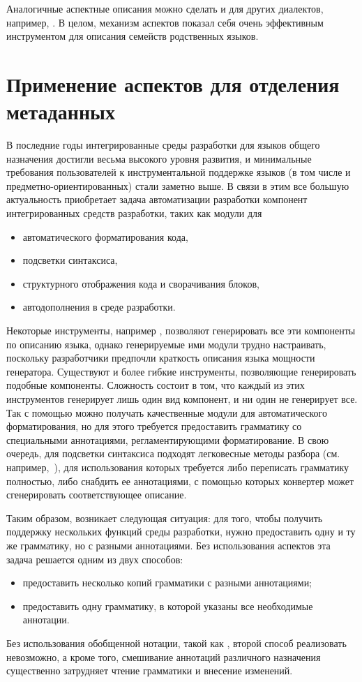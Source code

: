 Аналогичные аспектные описания можно сделать и для других диалектов, например,  \cite{Derby}.
В целом, механизм аспектов показал себя очень эффективным инструментом для описания семейств родственных языков.

\section{Применение аспектов для отделения метаданных}

В последние годы интегрированные среды разработки для языков общего назначения достигли весьма высокого уровня развития, и минимальные требования пользователей к инструментальной поддержке языков (в том числе и предметно-ориентированных) стали заметно выше. В связи в этим все большую актуальность приобретает задача автоматизации разработки компонент интегрированных средств разработки, таких как модули для
\begin{itemize}
	\item автоматического форматирования кода,
	\item подсветки синтаксиса,
	\item структурного отображения кода и сворачивания блоков,
	\item автодополнения в среде разработки.
\end{itemize}

Некоторые инструменты, например \cite{xText}, позволяют генерировать все эти компоненты по описанию языка, однако генерируемые ими модули трудно настраивать, поскольку разработчики предпочли краткость описания языка мощности генератора. Существуют и более гибкие инструменты, позволяющие генерировать подобные компоненты. Сложность состоит в том, что каждый из этих инструментов генерирует лишь один вид компонент, и ни один не генерирует все. Так с помощью  \cite{Pretzel} можно получать качественные модули для автоматического форматирования, но для этого требуется предоставить грамматику со специальными аннотациями, регламентирующими форматирование. В свою очередь, для подсветки синтаксиса подходят легковесные методы разбора (см. например,~\cite{RegReg}), для использования которых требуется либо переписать грамматику полностью, либо снабдить ее аннотациями, с помощью которых конвертер может сгенерировать соответствующее описание.

Таким образом, возникает следующая ситуация: для того, чтобы получить поддержку нескольких функций среды разработки, нужно предоставить одну и ту же грамматику, но с разными аннотациями. Без использования аспектов эта задача решается одним из двух способов:
\begin{itemize}
\item предоставить несколько копий грамматики с разными аннотациями;
\item предоставить одну грамматику, в которой указаны все необходимые аннотации.
\end{itemize}
Без использования обобщенной нотации, такой как \GRM{}, второй способ реализовать невозможно, а кроме того, смешивание аннотаций различного назначения существенно затрудняет чтение грамматики и внесение изменений.

